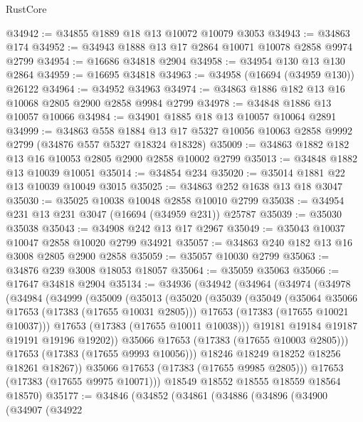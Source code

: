 \begin{lexlean}{RustCore}
\begin{coremodule}
@34942 := @34855 @1889 @18 @13 @10072 @10079 @3053
@34943 := @34863 @174
@34952 := @34943 @1888 @13 @17 @2864 @10071 @10078 @2858 @9974 @2799
@34954 := @16686 @34818 @2904
@34958 := @34954 @130 @13 @130 @2864
@34959 := @16695 @34818
@34963 := @34958 (@16694 (@34959 @130)) @26122
@34964 := @34952 @34963
@34974 := @34863 @1886 @182 @13 @16 @10068 @2805 @2900 @2858 @9984 @2799
@34978 := @34848 @1886 @13 @10057 @10066
@34984 := @34901 @1885 @18 @13 @10057 @10064 @2891
@34999 := @34863
    @558
    @1884
    @13
    @17
    @5327
    @10056
    @10063
    @2858
    @9992
    @2799
    (@34876 @557 @5327 @18324 @18328)
@35009 := @34863 @1882 @182 @13 @16 @10053 @2805 @2900 @2858 @10002 @2799
@35013 := @34848 @1882 @13 @10039 @10051
@35014 := @34854 @234
@35020 := @35014 @1881 @22 @13 @10039 @10049 @3015
@35025 := @34863 @252 @1638 @13 @18 @3047
@35030 := @35025 @10038 @10048 @2858 @10010 @2799
@35038 := @34954 @231 @13 @231 @3047 (@16694 (@34959 @231)) @25787
@35039 := @35030 @35038
@35043 := @34908 @242 @13 @17 @2967
@35049 := @35043 @10037 @10047 @2858 @10020 @2799 @34921
@35057 := @34863 @240 @182 @13 @16 @3008 @2805 @2900 @2858
@35059 := @35057 @10030 @2799
@35063 := @34876 @239 @3008 @18053 @18057
@35064 := @35059 @35063
@35066 := @17647 @34818 @2904
@35134 := @34936
    (@34942
      (@34964
        (@34974
          (@34978
            (@34984
              (@34999
                (@35009
                  (@35013
                    (@35020
                      (@35039
                        (@35049
                          (@35064 @35066 @17653 (@17383 (@17655 @10031 @2805)))
                          @17653
                          (@17383 (@17655 @10021 @10037)))
                        @17653
                        (@17383 (@17655 @10011 @10038)))
                      @19181
                      @19184
                      @19187
                      @19191
                      @19196
                      @19202))
                  @35066
                  @17653
                  (@17383 (@17655 @10003 @2805)))
                @17653
                (@17383 (@17655 @9993 @10056)))
              @18246
              @18249
              @18252
              @18256
              @18261
              @18267))
          @35066
          @17653
          (@17383 (@17655 @9985 @2805)))
        @17653
        (@17383 (@17655 @9975 @10071)))
      @18549
      @18552
      @18555
      @18559
      @18564
      @18570)
@35177 := @34846
    (@34852
      (@34861
        (@34886
          (@34896
            (@34900
              (@34907
                (@34922

\end{coremodule}
\end{lexlean}

